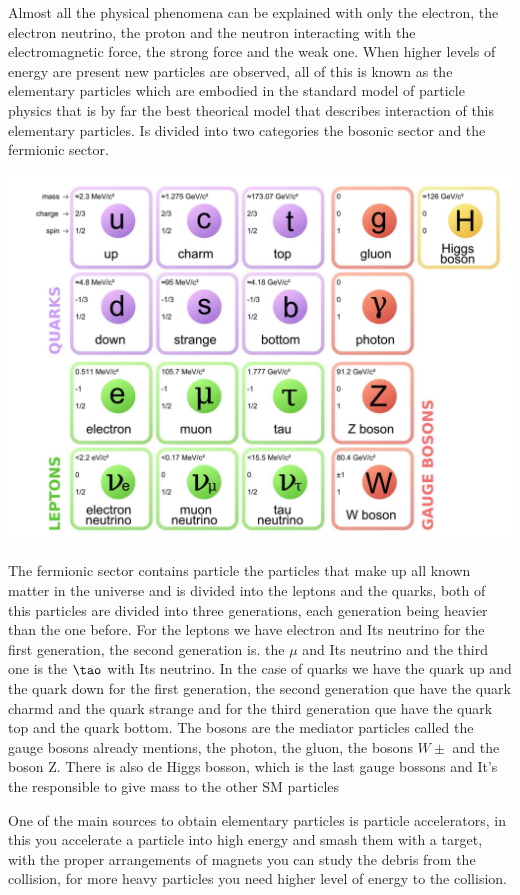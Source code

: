 Almost all the physical phenomena can be explained with only the electron, the electron neutrino, the proton and the neutron interacting with the electromagnetic force, the strong force and the weak one. When higher levels of energy are present new particles are observed, all of this is known as the elementary particles which are embodied in the standard model of particle physics that is by far the best theorical model that describes interaction of this elementary particles. Is divided into two categories the bosonic sector and the fermionic sector.  \cite{mppthomson}   

\includegraphics[scale=0.7]{sm.png}

The fermionic sector contains particle the particles that make up all known matter in the universe and is divided into the leptons and the quarks, both of this particles are divided into three generations, each generation being heavier than the one before. For the leptons we have electron and Its neutrino for the first generation, the second generation is. the $\mu$ and Its neutrino and the third one is the $\tao$ with Its neutrino. In the case of quarks we have the quark up and the quark down for the first generation, the second generation que have the quark charmd and the quark strange and for the third generation que have the quark top and the quark bottom. The bosons are the mediator particles called the gauge bosons already mentions, the photon, the gluon, the bosons $W\pm$ and the boson Z. There is also de Higgs bosson, which is the last gauge bossons and It's the responsible to give mass to the other SM particles  


One of the main sources to obtain elementary particles is particle accelerators, in this you accelerate a particle into high energy and smash them with a target, with the proper  arrangements of magnets you can study the debris from the collision, for more heavy particles you need higher level of energy to the collision.


